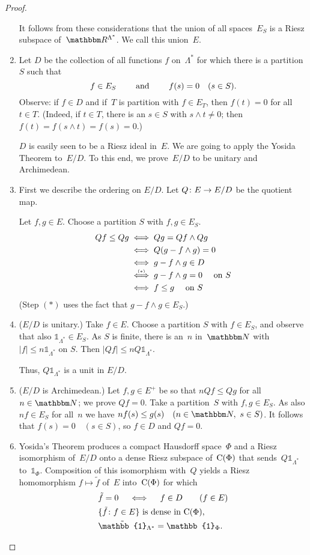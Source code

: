 \documentclass[main.tex]{subfiles}
\begin{document}
\begin{proof}
\begin{enumerate}[label=(\Roman*),itemindent=3em,labelwidth=3em]
It follows from these considerations 
that the union of all spaces~$E_S$
is a Riesz subspace of~$\R^{\Lambda^*}$.
We call this union~$E$.
%
\item \label{3.20-III}
Let $D$ be the collection of all functions $f$ on~$\Lambda^*$
for which there is a partition~$S$ such that
\begin{equation*}
f\in E_S \qquad \text{ and } \qquad f(s)=0 \quad (s\in S)\text{.}
\end{equation*}
Observe: if $f\in D$ 
and if~$T$ is  
partition with $f\in E_T$,
then $f(t)=0$ for all $t\in T$.
(Indeed, if $t\in T$,
there is an $s\in S$ with $s\wedge t\neq 0$;
then $f(t)=f(s\wedge t)=f(s)=0$.)

$D$ is easily seen to be a Riesz ideal in~$E$.
We are going to apply the Yosida Theorem to~$E/D$.
To this end, 
we prove~$E/D$
to be unitary and Archimedean.
%
\item \label{3.20-IV}
First we describe the ordering on $E/D$.
Let $Q\colon E\rightarrow E/D$ be the quotient map.

Let $f,g\in E$. 
Choose a partition $S$ with $f,g\in E_S$.
\begin{align*}
Qf \leq Qg 
& \iff Qg = Qf \wedge Qg \\
& \iff Q(g-f\wedge g)=0 \\
& \iff g-f\wedge g \in D \\
& \mathrel{\smash{ \stackrel{\scriptscriptstyle (*)}{\iff}}} g-f\wedge g =0\quad\text{ on }S \\
& \iff f\leq g\quad\text{ on }S
\end{align*}
(Step $(*)$ uses the fact that $g-f\wedge g\in E_S$.)
%
\item \label{3.20-V}
($E/D$ is unitary.)
Take $f\in E$.
Choose a partition $S$ with $f\in E_S$,
and observe that also
$\mathbb{1}_{\Lambda^*}\in E_S$.
As $S$ is finite, 
there is an~$n$ in~$\N$
with $|f|\leq n \mathbb{1}_{\Lambda^*}$ on $S$.
Then $|Qf|\leq n Q\mathbb{1}_{\Lambda^*}$.

Thus, $Q\mathbb{1}_{\Lambda^*}$ is a unit in $E/D$.
%
\item \label{3.20-VI}
($E/D$ is Archimedean.)
Let $f,g\in E^+$ be so that $nQf\leq Qg$ for all $n\in \N$;
we prove $Qf=0$.
Take a partition~$S$ with $f,g\in E_S$.
As also $nf\in E_S$
for all~$n$
we have $nf(s)\leq g(s)\quad(n\in \N,\ s\in S)$.
It follows that $f(s)=0\quad (s\in S)$,
so $f\in D$ and $Qf=0$.
%
\item \label{3.20-VII}
Yosida's Theorem produces a compact Hausdorff space~$\Phi$
and a Riesz isomorphism of~$E/D$ 
onto a dense Riesz subspace of~$\mathrm{C}(\Phi)$
that sends~$Q\mathbb{1}_{\Lambda^*}$ to~$\mathbb{1}_\Phi$.
Composition of this isomorphism with~$Q$ 
yields a Riesz homomorphism $f\mapsto \tilde{f}$
of~$E$ into~$\mathrm{C}(\Phi)$ for which
\begin{alignat*}{2}
& \tilde{f} = 0 \quad \iff \quad f\in D\qquad (f\in E) \\
& \{ \tilde{f}\colon f\in E\} \htam{ is dense in } \Cont{\Phi}\htam{, } \\
& \tilde{\mathbb{1}}_{\Lambda^*} = \mathbb{1}_\Phi\htam{.}
\end{alignat*}


\end{enumerate}
\end{proof}
\end{document}
